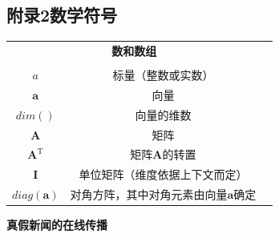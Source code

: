 \documentclass[a4paper,AutoFakeBold,oneside,12pt]{book}
\begin{document}
\begin{nopagenumber}
	\clearpage
	\section*{附录2\quad{}数学符号}
	\begin{center}
		\begin{tabular}{ccc}
			\multicolumn{2}{c}{\textbf{数和数组}}                          \\
			\\
			$a$                 & 标量（整数或实数）                       \\
			$\bm{a}$            & 向量                                     \\
			$dim()$             & 向量的维数                               \\
			$\bm{A}$            & 矩阵                                     \\
			$\bm{A}^\mathrm{T}$ & 矩阵$\textbf{A}$的转置                   \\
			$\bm{I}$            & 单位矩阵（维度依据上下文而定）           \\
			$diag(\bm{a})$      & 对角方阵，其中对角元素由向量$\bm{a}$确定 \\
		\end{tabular}
	\end{center}

	\newpage\backmatter

	\blankmatter
	\thispagestyle{empty}
	\begin{center}
		
		
	\end{center}

	\setcounter{chapter}{0}
	\renewcommand{\thefigure}{~外\arabic{chapter}-\arabic{figure}~}
	\renewcommand{\theequation}{~外\arabic{chapter}-\arabic{equation}~}
	\renewcommand{\thetable}{~外\arabic{chapter}-\arabic{table}~}

	\begin{center}
	\end{center}
	\vspace{8mm}
	\thispagestyle{empty}


	\begin{center}
		\sanhao\heiti\textbf{真假新闻的在线传播}


\end{center}
\end{nopagenumber}
\end{document}
